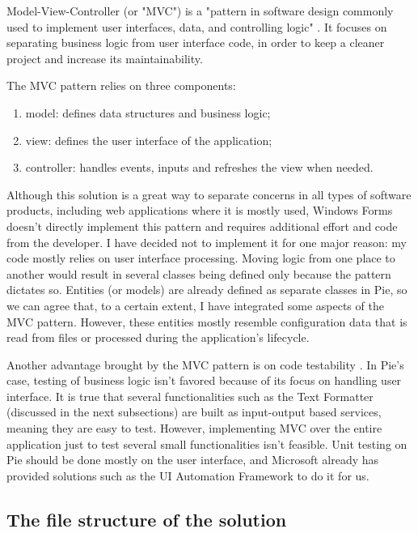 Model-View-Controller (or "MVC") is a "pattern in software design commonly used to implement user interfaces, data, and controlling logic" \cite{mozilla-mvc}. It focuses on separating business logic from user interface code, in order to keep a cleaner project and increase its maintainability.

The MVC pattern relies on three components:

\begin{enumerate}
  \item model: defines data structures and business logic;
  \item view: defines the user interface of the application;
  \item controller: handles events, inputs and refreshes the view when needed. 
\end{enumerate}

Although this solution is a great way to separate concerns in all types of software products, including web applications where it is mostly used, Windows Forms doesn't directly implement this pattern and requires additional effort and code from the developer. I have decided not to implement it for one major reason: my code mostly relies on user interface processing. Moving logic from one place to another would result in several classes being defined only because the pattern dictates so. Entities (or models) are already defined as separate classes in Pie, so we can agree that, to a certain extent, I have integrated some aspects of the MVC pattern. However, these entities mostly resemble configuration data that is read from files or processed during the application's lifecycle.

Another advantage brought by the MVC pattern is on code testability \cite{mvc-testability}. In Pie's case, testing of business logic isn't favored because of its focus on handling user interface. It is true that several functionalities such as the Text Formatter (discussed in the next subsections) are built as input-output based services, meaning they are easy to test. However, implementing MVC over the entire application just to test several small functionalities isn't feasible. Unit testing on Pie should be done mostly on the user interface, and Microsoft already has provided solutions such as the UI Automation Framework \cite{ui-automation-framework} to do it for us.

\subsection{The file structure of the solution}

